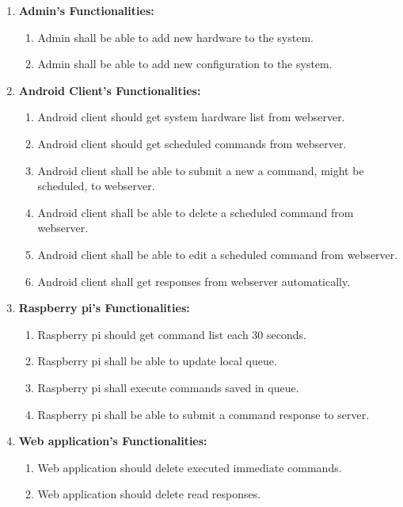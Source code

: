 \documentclass[12pt, oneside, a4paper]{book}
\newcommand\boldcolor[1]{\textcolor{bold}{\textbf{#1}}}
\begin{document}
				\begin{enumerate}[label=3.2.3.\arabic*]
					\item \boldcolor{Admin's Functionalities:}
					\begin{enumerate}
						\item Admin shall be able to add new hardware to the system.
						\item Admin shall be able to add new configuration to the system.
					\end{enumerate}
					\item \boldcolor{Android Client's Functionalities:}
					\begin{enumerate}
						\item Android client should get system hardware list from webserver.
						\item Android client should get scheduled commands from webserver.
						\item Android client shall be able to submit a new a command, might be scheduled,
						to webserver.	
						\item Android client shall be able to delete a scheduled command from webserver.
						\item Android client shall be able to edit a scheduled command from webserver.
						\item Android client shall get responses from webserver automatically.
					\end{enumerate}
					\item \boldcolor{Raspberry pi's Functionalities:}
					\begin{enumerate}
						\item Raspberry pi should get command list each 30 seconds.
						\item Raspberry pi shall be able to update local queue.
						\item Raspberry pi shall execute commands saved in queue.
						\item Raspberry pi shall be able to submit a command response to server.
					\end{enumerate}
					\item \boldcolor{Web application's Functionalities:}
					\begin{enumerate}
						\item Web application should delete executed immediate commands.
						\item Web application should delete read responses.
					\end{enumerate}
				\end{enumerate}
\end{document}
